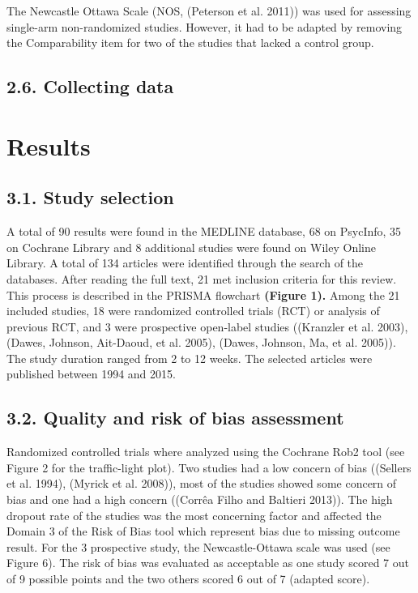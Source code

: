 \documentclass[
  12pt,
]{article}
\begin{document}
The Newcastle Ottawa Scale (NOS, (Peterson et al. 2011)) was used for
assessing single-arm non-randomized studies. However, it had to be
adapted by removing the Comparability item for two of the studies that
lacked a control group.

\subsection{2.6. Collecting data}\label{collecting-data}

\section{Results}\label{results}

\subsection{3.1. Study selection}\label{study-selection-1}

A total of 90 results were found in the MEDLINE database, 68 on
PsycInfo, 35 on Cochrane Library and 8 additional studies were found on
Wiley Online Library. A total of 134 articles were identified through
the search of the databases. After reading the full text, 21 met
inclusion criteria for this review. This process is described in the
PRISMA flowchart \textbf{(Figure 1).} Among the 21 included studies, 18
were randomized controlled trials (RCT) or analysis of previous RCT, and
3 were prospective open-label studies ((Kranzler et al. 2003), (Dawes,
Johnson, Ait-Daoud, et al. 2005), (Dawes, Johnson, Ma, et al. 2005)).
The study duration ranged from 2 to 12 weeks. The selected articles were
published between 1994 and 2015.

\subsection{3.2. Quality and risk of bias
assessment}\label{quality-and-risk-of-bias-assessment}

Randomized controlled trials where analyzed using the Cochrane Rob2 tool
(see Figure 2 for the traffic-light plot). Two studies had a low concern
of bias ((Sellers et al. 1994), (Myrick et al. 2008)), most of the
studies showed some concern of bias and one had a high concern ((Corrêa
Filho and Baltieri 2013)). The high dropout rate of the studies was the
most concerning factor and affected the Domain 3 of the Risk of Bias
tool which represent bias due to missing outcome result. For the 3
prospective study, the Newcastle-Ottawa scale was used (see Figure 6).
The risk of bias was evaluated as acceptable as one study scored 7 out
of 9 possible points and the two others scored 6 out of 7 (adapted
score).
\end{document}
